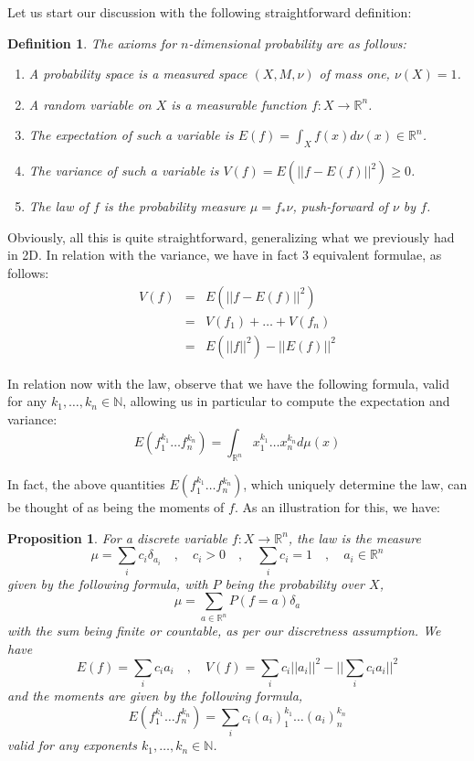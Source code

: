 \documentclass[12pt]{amsbook}
\newtheorem{definition}[theorem]{Definition}
\newtheorem{proposition}[theorem]{Proposition}
\begin{document}
\bigskip

Let us start our discussion with the following straightforward definition:

\begin{definition}
The axioms for $n$-dimensional probability are as follows:
\begin{enumerate}
\item A probability space is a measured space $(X,M,\nu)$ of mass one, $\nu(X)=1$.

\item A random variable on $X$ is a measurable function $f:X\to\mathbb R^n$.

\item The expectation of such a variable is $E(f)=\int_Xf(x)d\nu(x)\in\mathbb R^n$.

\item The variance of such a variable is $V(f)=E(||f-E(f)||^2)\geq0$.

\item The law of $f$ is the probability measure $\mu=f_*\nu$, push-forward of $\nu$ by $f$.
\end{enumerate}
\end{definition}

Obviously, all this is quite straightforward, generalizing what we previously had in 2D. In relation with the variance, we have in fact 3 equivalent formulae, as follows:
\begin{eqnarray*}
V(f)
&=&E(||f-E(f)||^2)\\
&=&V(f_1)+\ldots+V(f_n)\\
&=&E(||f||^2)-||E(f)||^2
\end{eqnarray*}

In relation now with the law, observe that we have the following formula, valid for any  $k_1,\ldots,k_n\in\mathbb N$, allowing us in particular to compute the expectation and variance:
$$E(f_1^{k_1}\ldots f_n^{k_n})=\int_{\mathbb R^n}x_1^{k_1}\ldots x_n^{k_n}d\mu(x)$$

In fact, the above quantities $E(f_1^{k_1}\ldots f_n^{k_n})$, which uniquely determine the law, can be thought of as being the moments of $f$. As an illustration for this, we have:


\begin{proposition}
For a discrete variable $f:X\to\mathbb R^n$, the law is the measure
$$\mu=\sum_i c_i\delta_{a_i}\quad,\quad c_i>0\quad,\quad\sum_ic_i=1\quad,\quad a_i\in\mathbb R^n$$
given by the following formula, with $P$ being the probability over $X$,
$$\mu=\sum_{a\in\mathbb R^n}P(f=a)\delta_a$$
with the sum being finite or countable, as per our discretness assumption. We have
$$E(f)=\sum_ic_ia_i\quad,\quad V(f)=\sum_ic_i||a_i||^2-\Big|\Big|\sum_ic_ia_i\Big|\Big|^2$$
and the moments are given by the following formula,
$$E(f_1^{k_1}\ldots f_n^{k_n})=\sum_ic_i(a_i)_1^{k_1}\ldots(a_i)_n^{k_n}$$
valid for any exponents $k_1,\ldots,k_n\in\mathbb N$.
\end{proposition}
\end{document}
